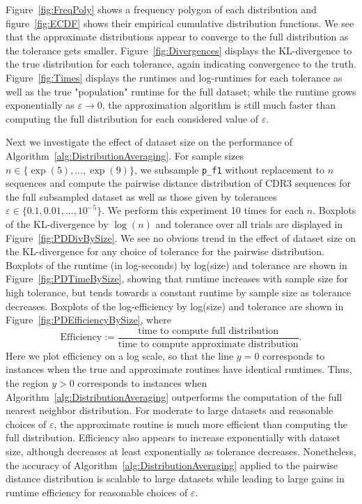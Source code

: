 \documentclass{article}
\begin{document}
Figure~\ref{fig:FreqPoly} shows a frequency polygon of each distribution and figure~\ref{fig:ECDF} shows their empirical cumulative distribution functions.
We see that the approximate distributions appear to converge to the full distribution as the tolerance gets smaller.
Figure~\ref{fig:Divergences} displays the KL-divergence to the true distribution for each tolerance, again indicating convergence to the truth.
Figure~\ref{fig:Times} displays the runtimes and log-runtimes for each tolerance as well as the true "population" runtime for the full dataset; while the runtime grows exponentially as $\varepsilon \to 0$, the approximation algorithm is still much faster than computing the full distribution for each considered value of $\varepsilon$.

Next we investigate the effect of dataset size on the performance of Algorithm~\ref{alg:DistributionAveraging}.
For sample sizes $n \in \{\exp(5), \dotsc, \exp(9)\}$, we subsample \texttt{p\_f1} without replacement to $n$ sequences and compute the pairwise distance distribution of CDR3 sequences for the full subsampled dataset as well as those given by tolerances $\varepsilon \in \{0.1, 0.01, ..., 10^{-5} \}$.
We perform this experiment 10 times for each $n$.
Boxplots of the KL-divergence by $\log(n)$ and tolerance over all trials are displayed in Figure~\ref{fig:PDDivBySize}.
We see no obvious trend in the effect of dataset size on the KL-divergence for any choice of tolerance for the pairwise distribution.
Boxplots of the runtime (in log-seconds) by log(size) and tolerance are shown in Figure~\ref{fig:PDTimeBySize}, showing that runtime increases with sample size for high tolerance, but tends towards a constant runtime by sample size as tolerance decreases.
Boxplots of the log-efficiency by log(size) and tolerance are shown in Figure~\ref{fig:PDEfficiencyBySize}, where
\begin{equation}\label{eq:Efficiency}
	\text{Efficiency} :=
		\frac{\text{time to compute full distribution}
		}{
			  \text{time to compute approximate distribution}
		}.
\end{equation}
Here we plot efficiency on a log scale, so that the line $y=0$ corresponds to instances when the true and approximate routines have identical runtimes.
Thus, the region $y > 0$ corresponds to instances when Algorithm~\ref{alg:DistributionAveraging} outperforms the computation of the full nearest neighbor distribution.
For moderate to large datasets and reasonable choices of $\varepsilon$, the approximate routine is much more efficient than computing the full distribution.
Efficiency also appears to increase exponentially with dataset size, although decreases at least exponentially as tolerance decreases.
Nonetheless, the accuracy of Algorithm~\ref{alg:DistributionAveraging} applied to the pairwise distance distribution is scalable to large datasets while leading to large gains in runtime efficiency for reasonable choices of $\varepsilon$.
\end{document}
